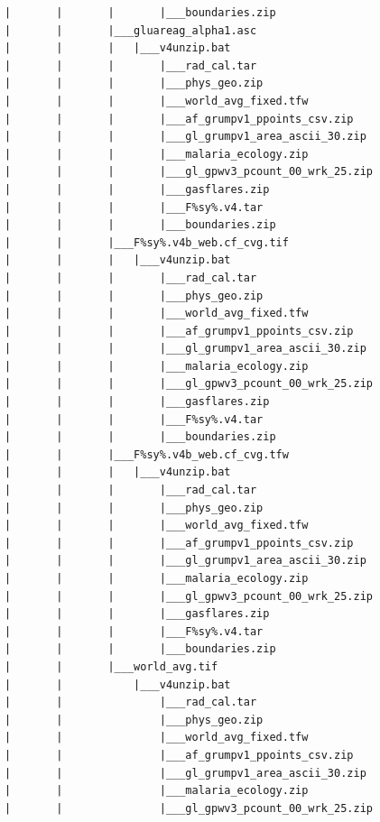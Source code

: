 \documentclass[]{book}
\begin{document}
\begin{verbatim}
            |       |       |       |___boundaries.zip
            |       |       |___gluareag_alpha1.asc
            |       |       |   |___v4unzip.bat
            |       |       |       |___rad_cal.tar
            |       |       |       |___phys_geo.zip
            |       |       |       |___world_avg_fixed.tfw
            |       |       |       |___af_grumpv1_ppoints_csv.zip
            |       |       |       |___gl_grumpv1_area_ascii_30.zip
            |       |       |       |___malaria_ecology.zip
            |       |       |       |___gl_gpwv3_pcount_00_wrk_25.zip
            |       |       |       |___gasflares.zip
            |       |       |       |___F%sy%.v4.tar
            |       |       |       |___boundaries.zip
            |       |       |___F%sy%.v4b_web.cf_cvg.tif
            |       |       |   |___v4unzip.bat
            |       |       |       |___rad_cal.tar
            |       |       |       |___phys_geo.zip
            |       |       |       |___world_avg_fixed.tfw
            |       |       |       |___af_grumpv1_ppoints_csv.zip
            |       |       |       |___gl_grumpv1_area_ascii_30.zip
            |       |       |       |___malaria_ecology.zip
            |       |       |       |___gl_gpwv3_pcount_00_wrk_25.zip
            |       |       |       |___gasflares.zip
            |       |       |       |___F%sy%.v4.tar
            |       |       |       |___boundaries.zip
            |       |       |___F%sy%.v4b_web.cf_cvg.tfw
            |       |       |   |___v4unzip.bat
            |       |       |       |___rad_cal.tar
            |       |       |       |___phys_geo.zip
            |       |       |       |___world_avg_fixed.tfw
            |       |       |       |___af_grumpv1_ppoints_csv.zip
            |       |       |       |___gl_grumpv1_area_ascii_30.zip
            |       |       |       |___malaria_ecology.zip
            |       |       |       |___gl_gpwv3_pcount_00_wrk_25.zip
            |       |       |       |___gasflares.zip
            |       |       |       |___F%sy%.v4.tar
            |       |       |       |___boundaries.zip
            |       |       |___world_avg.tif
            |       |           |___v4unzip.bat
            |       |               |___rad_cal.tar
            |       |               |___phys_geo.zip
            |       |               |___world_avg_fixed.tfw
            |       |               |___af_grumpv1_ppoints_csv.zip
            |       |               |___gl_grumpv1_area_ascii_30.zip
            |       |               |___malaria_ecology.zip
            |       |               |___gl_gpwv3_pcount_00_wrk_25.zip

\end{verbatim}
\end{document}
